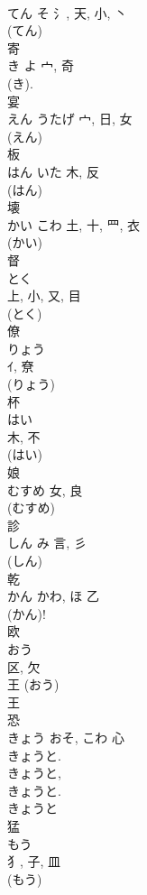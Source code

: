 \documentclass[8pt]{extreport}
\begin{document}
\begin{CJK}{UTF8}{min}
\\	てん	そ	氵, 天, 小, 丶	
\\	(てん) 
\\	寄	
\\	き	よ	宀, 奇	
\\	(き).	
\\	宴	
\\	えん	うたげ	宀, 日, 女	
\\	(えん) 
\\	板	
\\	はん	いた	木, 反	
\\	(はん) 
\\	壊	
\\	かい	こわ	土, 十, 罒, 衣	
\\	(かい) 
\\	督	
\\	とく	
\\	上, 小, 又, 目	
\\	(とく) 
\\	僚	
\\	りょう	
\\	ｲ, 尞	
\\	(りょう) 
\\	杯	
\\	はい	
\\	木, 不	
\\	(はい) 
\\	娘	
\\	むすめ	女, 良	
\\	(むすめ) 
\\	診	
\\	しん	み	言, 彡		
\\	(しん) 
\\	乾	
\\	かん	かわ, ほ	乙	
\\	(かん)! 
\\	欧	
\\	おう	
\\	区, 欠	
\\	王 (おう) 
\\	王
\\	恐	
\\	きょう	おそ, こわ	心		
\\	きょうと. 
\\	きょうと, 
\\	きょうと. 
\\	きょうと 
\\	猛	
\\	もう	
\\	犭, 子, 皿	
\\	(もう) 

\end{CJK}
\end{document}
